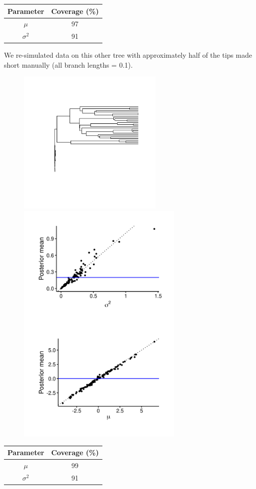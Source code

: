 \documentclass{article}
\begin{document}
\begin{center}
\begin{tabular}{c | c}
    Parameter & Coverage (\%) \\\hline
    $\mu$ & 97\\
    $\sigma^2$ & 91
\end{tabular}
\end{center}

\newpage

\noindent We re-simulated data on this other tree with approximately half of the tips made short manually (all branch lengths = 0.1).

\begin{figure}[!ht]
  \begin{minipage}[c]{.4\textwidth}
    \centering
    \includegraphics[width=7cm]{../BMMVN_nonultra_tree.png}
  \end{minipage}
  \hfill
  \begin{minipage}{.5\textwidth}
    \centering
    \includegraphics[width=8cm]{../BMMVN_nonultra_graphs.png}
  \end{minipage}
\end{figure}

\begin{center}
\begin{tabular}{c | c}
    Parameter & Coverage (\%) \\\hline
    $\mu$ & 99\\
    $\sigma^2$ & 91
\end{tabular}
\end{center}
\end{document}
